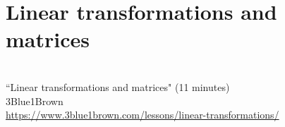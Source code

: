 \section{Linear transformations and matrices}
\begin{bookfigure}
   \\
  ``Linear transformations and matrices" (11 minutes) \\
  \footnotesize 3Blue1Brown \\
  \url{https://www.3blue1brown.com/lessons/linear-transformations/}
\end{bookfigure}

